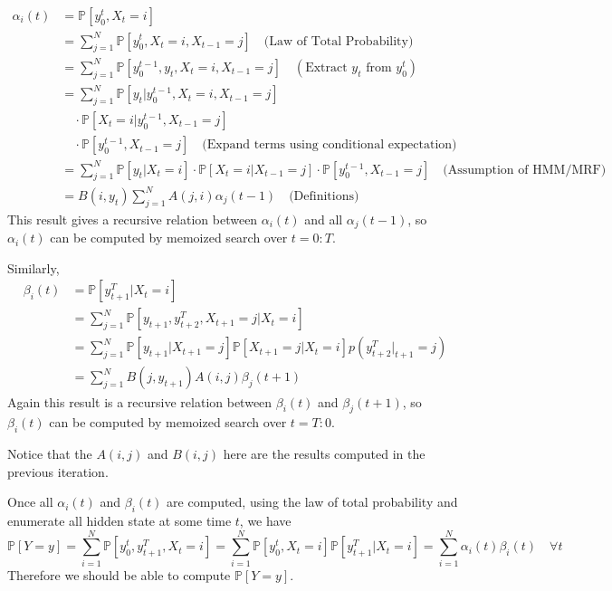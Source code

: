         \begin{align*}
            \alpha_i(t) &= \mathbb{P}[y_0^t, X_t=i]\\
            &= \sum_{j=1}^{N}\mathbb{P}[y_0^t,X_t=i,X_{t-1}=j] \quad \text{(Law of Total Probability)}\\
            &= \sum_{j=1}^{N}\mathbb{P}[y_0^{t-1},y_t,X_t=i,X_{t-1}=j] \quad (\text{Extract $y_t$ from $y_0^t$})\\
            &= \sum_{j=1}^{N}\mathbb{P}[y_t|y_0^{t-1},X_t=i,X_{t-1}=j]\\
            &\quad \cdot \mathbb{P}[X_t=i|y_0^{t-1},X_{t-1}=j]\\
            &\quad \cdot \mathbb{P}[y_0^{t-1},X_{t-1}=j] \quad \text{(Expand terms using conditional expectation)}\\
            &= \sum_{j=1}^{N}\mathbb{P}[y_t|X_t=i] \cdot \mathbb{P}[X_t=i|X_{t-1}=j] \cdot \mathbb{P}[y_0^{t-1},X_{t-1}=j]\quad\text{(Assumption of HMM/MRF)}\\
            &= B(i,y_t)\sum_{j=1}^{N}A(j,i)\alpha_j(t-1) \quad \text{(Definitions)}
        \end{align*}
        This result gives a recursive relation between $\alpha_i(t)$ and all $\alpha_j(t-1)$, so $\alpha_i(t)$ can be computed by memoized search over $t=0:T$.
    
        Similarly,
        \begin{align*}
            \beta_i(t) &= \mathbb{P}[y_{t+1}^T|X_t=i]\\
            &= \sum_{j=1}^{N}\mathbb{P}[y_{t+1},y_{t+2}^T,X_{t+1}=j|X_t=i]\\
            &= \sum_{j=1}^{N}\mathbb{P}[y_{t+1}|X_{t+1}=j]\mathbb{P}[X_{t+1}=j|X_t=i]p(y_{t+2}^T|_{t+1}=j)\\
            &= \sum_{j=1}^{N}B(j, y_{t+1})A(i,j)\beta_{j}(t+1)
        \end{align*}
        Again this result is a recursive relation between $\beta_i(t)$ and $\beta_j(t+1)$, so $\beta_i(t)$ can be computed by memoized search over $t=T:0$.
    
        Notice that the $A(i,j)$ and $B(i,j)$ here are the results computed in the previous iteration.
    
        Once all $\alpha_i(t)$ and $\beta_i(t)$ are computed, using the law of total probability and enumerate all hidden state at some time $t$, we have
        \[ \mathbb{P}[Y=y] = \sum_{i=1}^N\mathbb{P}[y_0^t, y_{t+1}^T, X_t=i] = \sum_{i=1}^N \mathbb{P}[y_0^t, X_t=i]\mathbb{P}[y_{t+1}^T|X_t=i] = \sum_{i=1}^N \alpha_i(t)\beta_i(t) \quad \forall t \]
        Therefore we should be able to compute $\mathbb{P}[Y=y]$.
    
